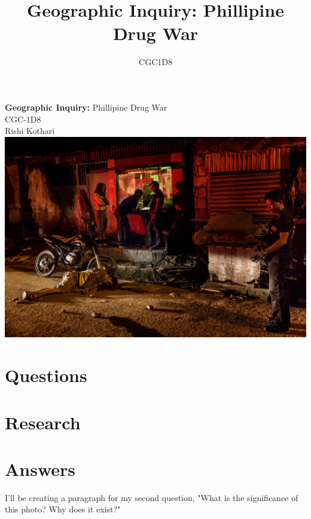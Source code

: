 \documentclass[titlepic]{report}
\title{\Huge \textbf{Geographic Inquiry: } Phillipine Drug War}
\date{CGC1D8}
\begin{document}
\begin{titlepage}
    \centering
    \vfill
    {\Huge
     \textbf{Geographic Inquiry: } Phillipine Drug War\\
     \vskip0.5cm
     \Large CGC-1D8\\
        \vskip0.5cm
        Rishi Kothari\\
    }    
    \vskip1cm
    \includegraphics[width=\columnwidth]{graphics/philliphine-drug-war-1.jpg} %
    \vfill
    \vfill
\end{titlepage}

\newpage

\tableofcontents
\newpage


\chapter{Questions}


\chapter{Research}


\chapter{Answers}
I'll be creating a paragraph for my second question, "What is the significance of this photo? Why does it exist?"


\printbibliography
\end{document}
